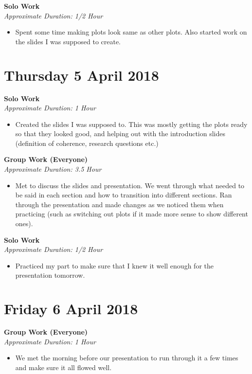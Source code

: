 \documentclass[12pt]{article}\usepackage[]{graphicx}\usepackage[]{color}
\begin{document}
\begin{itemize}
\textbf{Solo Work}\\
\emph{Approximate Duration: 1/2 Hour}
\begin{itemize}
\item Spent some time making plots look same as other plots. Also started work on the slides I was supposed to create.
\end{itemize}


\section*{Thursday 5 April 2018}

\textbf{Solo Work}\\
\emph{Approximate Duration: 1 Hour}
\begin{itemize}
\item Created the slides I was supposed to. This was mostly getting the plots ready so that they looked good, and helping out with the introduction slides (definition of coherence, research questions etc.)
\end{itemize}

\textbf{Group Work (Everyone)} \\
\emph{Approximate Duration: 3.5 Hour}

\begin{itemize}
\item Met to discuss the slides and presentation. We went through what needed to be said in each section and how to transition into different sections. Ran through the presentation and made changes as we noticed them when practicing (such as switching out plots if it made more sense to show different ones).
\end{itemize}

\textbf{Solo Work}\\
\emph{Approximate Duration: 1/2 Hour}
\begin{itemize}
\item Practiced my part to make sure that I knew it well enough for the presentation tomorrow.
\end{itemize}

\section*{Friday 6 April 2018}

\textbf{Group Work (Everyone)}\\
\emph{Approximate Duration: 1 Hour}
\begin{itemize}
\item We met the morning before our presentation to run through it a few times and make sure it all flowed well.
\end{itemize}


\end{itemize}
\end{document}
